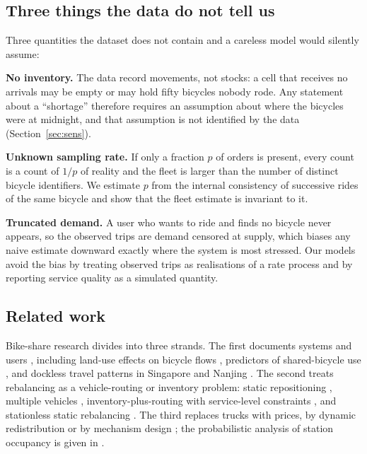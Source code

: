\subsection{Three things the data do not tell us}

Three quantities the dataset does not contain and a careless model would silently
assume:

\textbf{No inventory.} The data record movements, not stocks: a cell that receives no
arrivals may be empty or may hold fifty bicycles nobody rode. Any statement about a
``shortage'' therefore requires an assumption about where the bicycles were at
midnight, and that assumption is not identified by the data (Section~\ref{sec:sens}).

\textbf{Unknown sampling rate.} If only a fraction $p$ of orders is present, every
count is a count of $1/p$ of reality and the fleet is larger than the number of
distinct bicycle identifiers. We estimate $p$ from the internal consistency of
successive rides of the same bicycle and show that the fleet estimate is invariant to
it.

\textbf{Truncated demand.} A user who wants to ride and finds no bicycle never
appears, so the observed trips are demand censored at supply, which biases any naive
estimate downward exactly where the system is most stressed. Our models avoid the
bias by treating observed trips as realisations of a rate process and by reporting
service quality as a simulated quantity.

\subsection{Related work}

Bike-share research divides into three strands. The first documents systems and users
\cite{shaheen2010,fishman2013}, including land-use effects on bicycle flows
\cite{faghih2014}, predictors of shared-bicycle use \cite{bachand2012}, and dockless
travel patterns in Singapore and Nanjing \cite{shen2018,du2018}. The second treats
rebalancing as a vehicle-routing or inventory problem: static repositioning
\cite{raviv2013}, multiple vehicles \cite{chemia2013}, inventory-plus-routing with
service-level constraints \cite{schuijbroek2017}, and stationless static rebalancing
\cite{pal2017}. The third replaces trucks with prices, by dynamic redistribution
\cite{pfrommer2014} or by mechanism design \cite{singla2015}; the probabilistic
analysis of station occupancy is given in \cite{omahony2015}.

